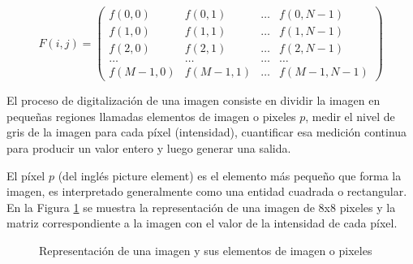 \begin{equation}
F(i,j) = 
\begin{pmatrix} 
f({0,0}) & f({0,1}) & \ldots & f({0,N-1}) \\
f({1,0}) & f({1,1}) & \ldots & f({1,N-1}) \\
f({2,0}) & f({2,1}) & \ldots & f({2,N-1}) \\ 
\ldots & \ldots & \ldots &  \ldots \\
f({M-1,0}) & f({M-1,1}) & \ldots & f({M-1,N-1})
\end{pmatrix}  
\label{representacion_imagen_digital}
\end{equation}

El proceso de digitalización de una imagen consiste en dividir la imagen en pequeñas regiones llamadas elementos de imagen o pixeles \textbf{$p$}, medir el nivel de gris de la imagen para cada píxel (intensidad), cuantificar esa medición continua para producir un valor entero y luego generar una salida.

El píxel \textbf{$p$} (del inglés picture element) es el elemento más pequeño que forma la imagen, es interpretado generalmente como una entidad cuadrada o rectangular. En la Figura \ref{imagen_pixeles} se muestra la representación de una imagen de 8x8 pixeles y la matriz correspondiente a la imagen con el valor de la intensidad de cada píxel.

\begin{figure}[H]
    \begin{center}
    \end{center}
    \caption{Representación de una imagen y sus elementos de imagen o pixeles}
    \label{imagen_pixeles}
\end{figure}

